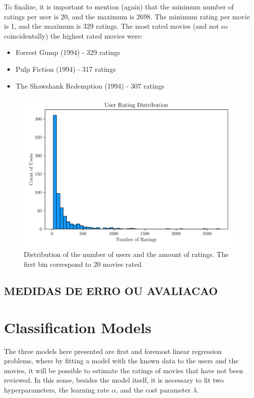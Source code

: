 \documentclass[conference]{IEEEtran}
\begin{document}
To finalize, it is important to mention (again) that the minimum number of ratings per user is 20, and the maximum is 2698. The minimum rating per movie is 1, and the maximum is 329 ratings. The most rated movies (and not so coincidentally) the highest rated movies were:
\begin{itemize}
    \item Forrest Gump (1994) - 329 ratings
    \item Pulp Fiction (1994) - 317 ratings
    \item The Shawshank Redemption (1994) - 307 ratings
\end{itemize}


\begin{figure}[H]
    \centering
    \includegraphics[width=1\linewidth]{assets/distribution_userratings.png}
    \caption{Distribution of the number of users and the amount of ratings. The first bin correspond to 20 movies rated.}    \label{fig:distribution_userratings}
\end{figure}

\subsection{MEDIDAS DE ERRO OU AVALIACAO}




\section{Classification Models}

The three models here presented are first and foremost linear regression problems, where by fitting a model with the known data to the users and the movies, it will be possible to estimate the ratings of movies that have not been reviewed. In this sense, besides the model itself, it is necessary to fit two hyperparameters, the learning rate $\alpha$, and the cost parameter $\lambda$. 
\end{document}
